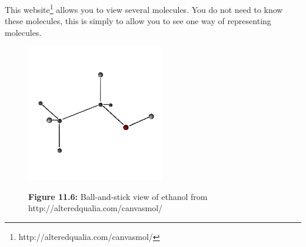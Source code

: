 	\par
\label{m38120*uid8310432}This website\footnote{http://alteredqualia.com/canvasmol/}
         allows you to view several molecules. You do 
not need to know these molecules, this is simply to allow you to see one way of 
representing molecules. 
    \setcounter{subfigure}{0}
	\begin{figure}[H] %
    \begin{center}
    \label{m38120*uid101!!!underscore!!!media}\label{m38120*uid10123!!!underscore!!!printimage}\includegraphics[width=6cm]{col11305.imgs/m38120_canvasmol.png} %
      \vspace{2pt}
    \vspace{\rubberspace}\par \begin{cnxcaption}
	  \small \textbf{Figure 11.6: }Ball-and-stick view of ethanol from http://alteredqualia.com/canvasmol/\footnotemark{}
	\end{cnxcaption}
    \vspace{.1in}
    \end{center}
 \end{figure}   
    \addtocounter{footnote}{-1}
\par 
\label{m38120*secfhsst!!!underscore!!!id115}
